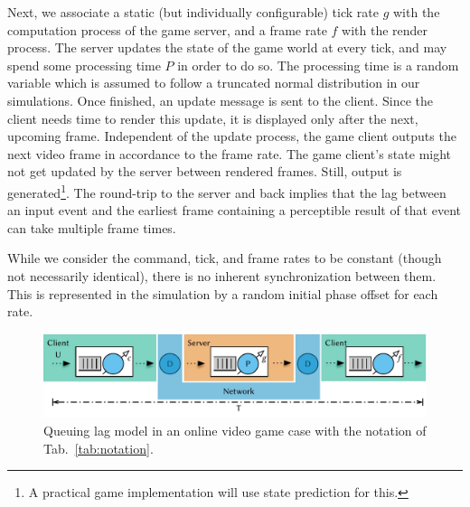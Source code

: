 Next, we associate a static (but individually configurable) tick rate $g$ with the computation process of the game server, and a frame rate $f$ with the render process. The server updates the state of the game world at every tick, and may spend some processing time $P$ in order to do so. The processing time is a random variable which is assumed to follow a truncated normal distribution in our simulations. Once finished, an update message is sent to the client. Since the client needs time to render this update, it is displayed only after the next, upcoming frame. Independent of the update process, the game client outputs the next video frame in accordance to the frame rate. The game client's state might not get updated by the server between rendered frames. Still, output is generated\footnote{A practical game implementation will use state prediction for this.}. The round-trip to the server and back implies that the lag between an input event and the earliest frame containing a perceptible result of that event can take multiple frame times.

While we consider the command, tick, and frame rates to be constant (though not necessarily identical), there is no inherent synchronization between them. This is represented in the simulation by a random initial phase offset for each rate.

\begin{figure}[!t]
	\centering
	\includegraphics[width=1.0\columnwidth]{../../../models/e2e-lag-model.pdf}
	\caption{Queuing lag model in an online video game case with the notation of Tab.~\ref{tab:notation}.}
\label{fig:queuing-model}
\end{figure}


